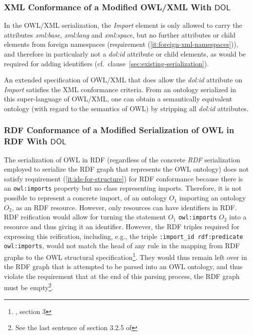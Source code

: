 \documentclass[10pt,fleqn,final]{scrreprt}
\newcommand{\cbs}[0]{\xspace}
\newcommand{\cbe}[0]{\xspace}
\newcommand*{\DOL}{\ensuremath{\mathsf{DOL}}\xspace}
\newcommand{\noterefname}{note}
\newcommand{\nref}[1]{\noterefname~\ref{#1}}
\renewcommand{\nref}[1]{\ref{nref-#1}} %
\newenvironment{definitions}[0]{\medskip }{}
\providecommand{\DIFadd}[1]{{\protect\color{blue}\uwave{#1}}} %
\providecommand{\DIFaddbegin}{} %
\providecommand{\DIFaddend}{} %
\providecommand{\DIFdelbegin}{} %
\providecommand{\DIFdelend}{} %
\begin{document}
\begin{definitions}
\subsubsection{XML Conformance of a Modified OWL/XML With \DOL}\DIFaddbegin \label{sec:xml-conf-modif}
\DIFaddend 

In the OWL/XML serialization, the \textit{Import} element \DIFaddbegin \DIFadd{does not have annotations and }\DIFaddend is only allowed to carry the attributes \textit{xml:base}, \textit{xml:lang} and \textit{xml:space}, but no further attributes or child elements from foreign namespaces (requirement (\ref{it:foreign-xml-namespaces})), and therefore in particularly not a \textit{dol:id} attribute or child elements, as would be required for adding identifiers (cf.\ clause~\ref{sec:existing-serialization}).

An extended specification of OWL/XML that does allow the \textit{dol:id} attribute on \textit{Import} satisfies the XML conformance criteria.
From an ontology serialized in this super-language of OWL/XML, one can obtain a semantically equivalent ontology (with regard to the semantics of OWL) by stripping all \textit{dol:id} attributes.

\subsubsection{RDF Conformance of a Modified Serialization of OWL in RDF With \DOL}

The serialization of OWL in RDF (regardless of the concrete \emph{RDF} serialization employed to serialize the RDF graph that represents the OWL ontology) does not satisfy \DIFdelbegin %
\DIFdelend requirement (\ref{it:ids-for-structure}) for RDF conformance because \DIFdelbegin %
\DIFdelend there is an \texttt{owl:imports} property but no class representing imports. 
Therefore, it is not possible to represent a concrete import, of an ontology $O_1$ importing an ontology $O_2$, as an RDF resource.
However, only resources can have identifiers in RDF.
RDF reification would allow for turning the statement $O_1$ \texttt{owl:imports} $O_2$ into a resource and thus giving it an identifier. 
However, the RDF triples required for expressing this reification, including, e.g., the triple \texttt{:import\_id rdf:predicate owl:imports},  would not match the head of any rule in the mapping from RDF graphs to the OWL structural specification\footnote{\DIFdelbegin %
\DIFdelend \DIFaddbegin \DIFadd{\nref{OWL2RDF}}\DIFaddend , section 3}. 
They would thus remain left over in the RDF graph that is attempted to be parsed into an OWL ontology, and thus violate the requirement that at the end of this parsing process, the RDF graph must be empty\footnote{See the last sentence of section 3.2.5 of \DIFdelbegin %
\DIFdelend \DIFaddbegin \DIFadd{\nref{OWL2RDF}}\DIFaddend }.


\end{definitions}
\end{document}
